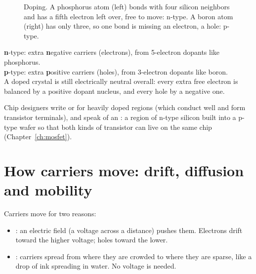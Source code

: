 \begin{figure}[h]
\centering
{}
\caption{Doping. A phosphorus atom (left) bonds with four silicon neighbors and has a fifth electron left over, free to move: n-type. A boron atom (right) has only three, so one bond is missing an electron, a hole: p-type.}
\label{fig:doping}
\end{figure}

\begin{remember}
\textbf{n}-type: extra \textbf{n}egative carriers (electrons), from 5-electron dopants like phosphorus.\\
\textbf{p}-type: extra \textbf{p}ositive carriers (holes), from 3-electron dopants like boron.\\
A doped crystal is still electrically neutral overall: every extra free electron is balanced by a positive dopant nucleus, and every hole by a negative one.
\end{remember}

Chip designers write  or  for heavily doped regions (which conduct well and form transistor terminals), and speak of an : a region of n-type silicon built into a p-type wafer so that both kinds of transistor can live on the same chip (Chapter~\ref{ch:mosfet}).

\section{How carriers move: drift, diffusion and mobility}

Carriers move for two reasons:
\begin{itemize}
  \item {}: an electric field (a voltage across a distance) pushes them. Electrons drift toward the higher voltage; holes toward the lower.
  \item {}: carriers spread from where they are crowded to where they are sparse, like a drop of ink spreading in water. No voltage is needed.
\end{itemize}

